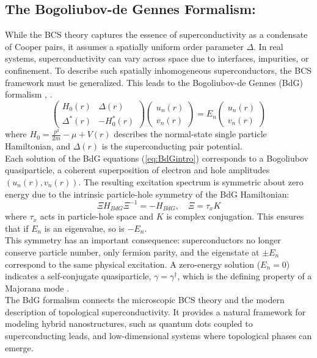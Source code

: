 \documentclass[11pt, letterpaper, titlepage]{article}
\begin{document}
\subsection{The Bogoliubov-de Gennes Formalism:}
While the BCS theory captures the essence of superconductivity as a condensate of Cooper pairs, it assumes a spatially uniform order parameter $Δ$. In real systems, superconductivity can vary across space due to interfaces, impurities, or confinement. To describe such spatially inhomogeneous superconductors, the BCS framework must be generalized. This leads to the Bogoliubov-de Gennes (BdG) formalism \cite{Cambridge_MBPhysics}, \cite{BCS}.\\
\begin{equation}
  \begin{pmatrix}
  H_0(r) & Δ(r) \\
  Δ^{*}(r) & -H_0^{*}(r)
  \end{pmatrix}
  \begin{pmatrix}
  u_n(r) \\
  v_n(r)
  \end{pmatrix}= E_n
  \begin{pmatrix}
  u_n(r) \\
  v_n(r)
  \end{pmatrix}
  \label{eq:BdGintro}
\end{equation}
where $H_0 = \frac{p²}{2m}-μ + V(r)$ describes the normal-state single particle Hamiltonian, and $Δ(r)$ is the superconducting pair potential.\\ 
Each solution of the BdG equations (\ref{eq:BdGintro}) corresponds to a Bogoliubov quasiparticle, a coherent superposition of electron and hole amplitudes $(u_n(r), v_n(r))$. The resulting excitation spectrum is symmetric about zero energy due to the intrinsic particle-hole symmetry of the BdG Hamiltonian:
\begin{equation}
  Ξ H_{BdG} Ξ^{-1} = -H_{BdG}, \quad Ξ = τ_x K
\end{equation}
where $τ_x$ acts in particle-hole space and $K$ is complex conjugation. This ensures that if $E_n$ is an eigenvalue, so is $-E_n$.\\
This symmetry has an important consequence: superconductors no longer conserve particle number, only fermion parity, and the eigenstate at $± E_n$ correspond to the same physical excitation. A zero-energy solution ($E_n = 0$) indicates a self-conjugate quasiparticle, $γ = γ^{†}$, which is the defining property of a Majorana mode \cite{Topocondmat}.\\
The BdG formalism connects the microscopic BCS theory and the modern description of topological superconductivity. It provides a natural framework for modeling hybrid nanostructures, such as quantum dots coupled to superconducting leads, and low-dimensional systems where topological phases can emerge.  \\
\end{document}
